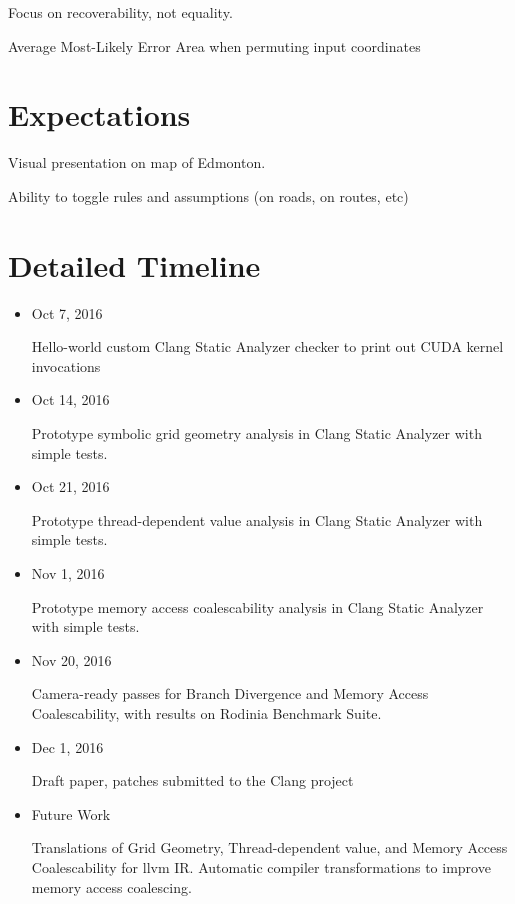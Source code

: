\documentclass{article}
\begin{document}
Focus on recoverability, not equality.

Average Most-Likely Error Area when permuting input coordinates

\section{Expectations}

Visual presentation on map of Edmonton.

Ability to toggle rules and assumptions (on roads, on routes, etc)

\section{Detailed Timeline}

    \begin{itemize}
        \item Oct 7, 2016

        Hello-world custom Clang Static Analyzer checker to print out CUDA kernel invocations

        \item Oct 14, 2016

        Prototype symbolic grid geometry analysis in Clang Static Analyzer with simple tests.

        \item Oct 21, 2016

        Prototype thread-dependent value analysis in Clang Static Analyzer with simple tests.

        \item Nov 1, 2016

        Prototype memory access coalescability analysis in Clang Static Analyzer with simple tests.

        \item Nov 20, 2016

        Camera-ready passes for Branch Divergence and Memory Access Coalescability, with results on Rodinia Benchmark Suite.

        \item Dec 1, 2016

        Draft paper, patches submitted to the Clang project


        \item Future Work

        Translations of Grid Geometry, Thread-dependent value, and Memory Access Coalescability for llvm IR.
        Automatic compiler transformations to improve memory access coalescing.


    \end{itemize}



\end{document}
